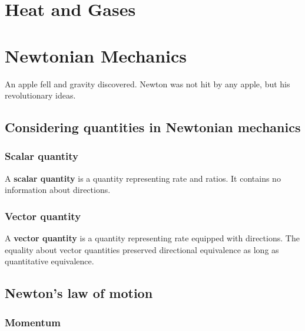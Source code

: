 \documentclass[12pt]{article}
\begin{document}
    \newpage
    \section{Heat and Gases}

    \newpage
    \section{Newtonian Mechanics}

    An apple fell and gravity discovered. Newton was not hit by any apple, but his revolutionary ideas.

    \subsection{Considering quantities in Newtonian mechanics}

    \subsubsection*{Scalar quantity}

    A \textbf{scalar quantity} is a quantity representing rate and ratios. It contains no information about directions.
    
    \subsubsection*{Vector quantity}

    A \textbf{vector quantity} is a quantity representing rate equipped with directions. The equality about vector quantities preserved directional equivalence as long as quantitative equivalence.

    \subsection{Newton's law of motion}

    \subsubsection*{Momentum}
\end{document}
